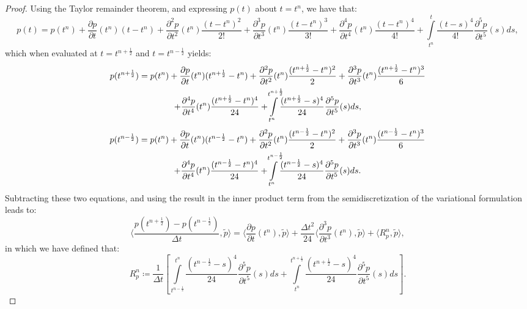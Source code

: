 \documentclass{amsart}
\theoremstyle{thmstyleone}%
\theoremstyle{thmstyletwo}%
\theoremstyle{thmstylethree}%
\newcommand{\ainnerproduct}[2]{\langle #1, #2 \rangle}
\begin{document}
\begin{proof}
Using the Taylor remainder theorem, and expressing $p(t)$ about $t = t^n$, we have that:
\[
  p(t) = p(t^n) + \dfrac{\partial p}{\partial t}(t^n)(t - t^n) + \dfrac{\partial^2 p}{\partial t^2}(t^n) \dfrac{(t - t^n)^2}{2!} + \dfrac{\partial^3 p}{\partial t^3}(t^n) \dfrac{(t - t^n)^3}{3!} + \dfrac{\partial^4 p}{\partial t^4}(t^n) \dfrac{(t - t^n)^4}{4!} + \int\limits_{t^n}^{t} \dfrac{(t - s)^4}{4!} \dfrac{\partial^5 p}{\partial t^5}(s) ds,
\]
which when evaluated at $t = t^{n + \frac{1}{2}}$ and $t = t^{n - \frac{1}{2}}$ yields:
\begin{multline*}
  p(t^{n + \frac{1}{2}}) = p(t^n) + \dfrac{\partial p}{\partial t}(t^n) (t^{n + \frac{1}{2}} - t^n) + \dfrac{\partial^2 p}{\partial t^2}(t^n) \dfrac{(t^{n + \frac{1}{2}} - t^n)^2}{2} + \dfrac{\partial^3 p}{\partial t^3}(t^n) \dfrac{(t^{n + \frac{1}{2}} - t^n)^3}{6} \\ + \dfrac{\partial^4 p}{\partial t^4}(t^n) \dfrac{(t^{n + \frac{1}{2}} - t^n)^4}{24} + \int\limits_{t^n}^{\mathclap{t^{n + \frac{1}{2}}}} \dfrac{(t^{n + \frac{1}{2}} - s)^4}{24} \dfrac{\partial^5 p}{\partial t^5}(s) ds, 
 \end{multline*}
\begin{multline*}
p(t^{n - \frac{1}{2}}) = p(t^n) + \dfrac{\partial p}{\partial t}(t^n)(t^{n - \frac{1}{2}} - t^n) + \dfrac{\partial^2 p}{\partial t^2}(t^n) \dfrac{(t^{n - \frac{1}{2}} - t^n)^2}{2} + \dfrac{\partial^3 p}{\partial t^3}(t^n) \dfrac{(t^{n - \frac{1}{2}} - t^n)^3}{6} \\ + \dfrac{\partial^4 p}{\partial t^4}(t^n) \dfrac{(t^{n - \frac{1}{2}} - t^n)^4}{24} + \int\limits_{t^n}^{\mathclap{t^{n - \frac{1}{2}}}} \dfrac{(t^{n - \frac{1}{2}} - s)^4}{24} \dfrac{\partial^5 p}{\partial t^5}(s) ds.
\end{multline*}
Subtracting these two equations, and using the result in the inner product term from the semidiscretization of the variational formulation leads to:
\[
  \ainnerproduct{\dfrac{p(t^{n + \frac{1}{2}}) - p(t^{n - \frac{1}{2}})}{\Delta t}}{\widetilde{p}} = \ainnerproduct{\dfrac{\partial p}{\partial t}(t^n)}{\widetilde{p}} + \dfrac{\Delta t^2}{24} \ainnerproduct{\dfrac{\partial^3 p}{\partial t^3}(t^n)}{\widetilde{p}} + \ainnerproduct{R^n_p}{\widetilde{p}},
\]
in which we have defined that:
\[
  R^n_p \coloneq \dfrac{1}{\Delta t} \left[\int\limits_{t^{n - \frac{1}{2}}}^{t^n} \dfrac{(t^{n - \frac{1}{2}} - s)^4}{24} \dfrac{\partial^5 p}{\partial t^5}(s) ds + \int\limits_{t^n}^{t^{n + \frac{1}{2}}} \dfrac{(t^{n + \frac{1}{2}} - s)^4}{24} \dfrac{\partial^5 p}{\partial t^5}(s) ds \right].
\]
\end{proof}
\end{document}
